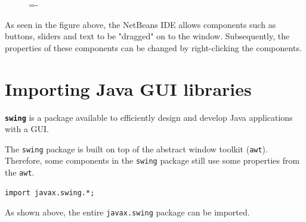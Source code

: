\documentclass[a4paper]{systems-software}
\begin{document}
\begin{figure}[H]
	\lineskip=-\fboxrule
\end{figure}

As seen in the figure above, the NetBeans IDE allows components such as buttons, sliders and text to be "dragged" on to the window. Subsequently, the properties of these components can be changed by right-clicking the components.


\section{Importing Java GUI libraries}

\textbf{\texttt{swing}} is a package available to efficiently design and develop Java applications with a GUI.

The \texttt{swing} package is built on top of the abstract window toolkit (\texttt{awt}). Therefore, some components in the \texttt{swing} package still use some properties from the \texttt{awt}.

\begin{lstlisting}[title={Importing the entire javax.swing package.}]
import javax.swing.*;
\end{lstlisting}

As shown above, the entire \texttt{javax.swing} package can be imported.
\end{document}
